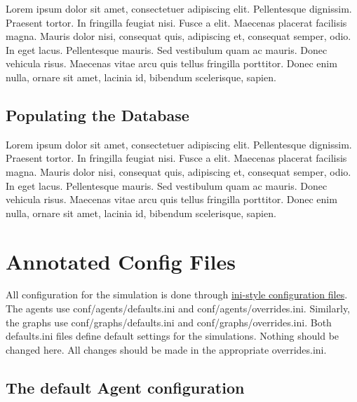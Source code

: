 \documentclass[11pt,letterpaper,onecolumn,twoside,openright,final]{report}
\begin{document}
Lorem ipsum dolor sit amet, consectetuer adipiscing elit.
Pellentesque dignissim.
Praesent tortor.
In fringilla feugiat nisi.
Fusce a elit.
Maecenas placerat facilisis magna.
Mauris dolor nisi, consequat quis, adipiscing et, consequat semper, odio.
In eget lacus.
Pellentesque mauris.
Sed vestibulum quam ac mauris.
Donec vehicula risus.
Maecenas vitae arcu quis tellus fringilla porttitor.
Donec enim nulla, ornare sit amet, lacinia id, bibendum scelerisque, sapien.

\section{Populating the Database}

Lorem ipsum dolor sit amet, consectetuer adipiscing elit.
Pellentesque dignissim.
Praesent tortor.
In fringilla feugiat nisi.
Fusce a elit.
Maecenas placerat facilisis magna.
Mauris dolor nisi, consequat quis, adipiscing et, consequat semper, odio.
In eget lacus.
Pellentesque mauris.
Sed vestibulum quam ac mauris.
Donec vehicula risus.
Maecenas vitae arcu quis tellus fringilla porttitor.
Donec enim nulla, ornare sit amet, lacinia id, bibendum scelerisque, sapien.


\chapter{Annotated Config Files}
All configuration for the simulation is done through \href{http://en.wikipedia.org/wiki/INI\_file}{ini-style configuration files}.
The agents use \mbox{conf/agents/defaults.ini} and \mbox{conf/agents/overrides.ini}.
Similarly, the graphs use \mbox{conf/graphs/defaults.ini} and \mbox{conf/graphs/overrides.ini}.
Both \mbox{defaults.ini} files define default settings for the simulations.
Nothing should be changed here.
All changes should be made in the appropriate \mbox{overrides.ini}.

\section{The default Agent configuration}
\end{document}
